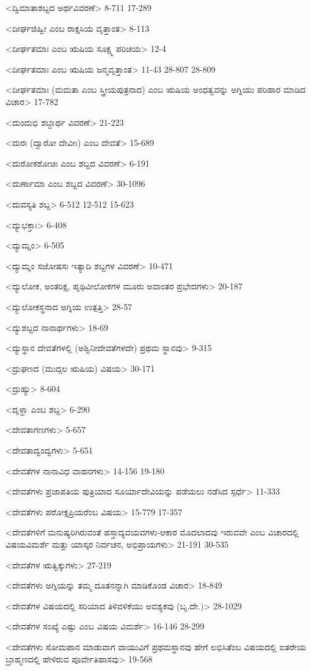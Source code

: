 <ದ್ವಿಮಾತಾಶಬ್ದದ ಅರ್ಥವಿವರಣೆ>
8-711
17-289

<ದೀರ್ಘಜಿಹ್ವೀ ಎಂಬ ರಾಕ್ಷಸಿಯ ವೃತ್ತಾಂತ>
8-113

<ದೀರ್ಘತಮಾಃ ಎಂಬ ಋಷಿಯ ಸೂಕ್ಷ್ಮ ಪರಿಚಯ>
12-4

<ದೀರ್ಘತಮಾಃ ಎಂಬ ಋಷಿಯ ಜನ್ಮವೃತ್ತಾಂತ>
11-43
28-807
28-809

<ದೀರ್ಘತಮಾಃ (ಮಮತಾ ಎಂಬ ಸ್ತ್ರೀಯಪುತ್ರನಾದ) ಎಂಬ ಋಷಿಯ ಅಂಧತ್ವವನ್ನು ಅಗ್ನಿಯು ಪರಿಹಾರ ಮಾಡಿದ ವಿಚಾರ>
17-782

<ದುಂದುಭಿ ಶಬ್ದಾರ್ಥ ವಿವರಣೆ>
21-223

<ದುರಃ (ದ್ವಾರೋ ದೇವೀಃ) ಎಂಬ ದೇವತೆ>
15-689

<ದುರೋಕಶೋಚಿಃ ಎಂಬ ಶಬ್ದದ ವಿವರಣೆ>
6-191

<ದುರ್ಣಾಮಾ ಎಂಬ ಶಬ್ದದ ವಿವರಣೆ>
30-1096

<ದುವಸ್ಯತಿ ಶಬ್ದ>
6-512 
12-512
15-623

<ದ್ಯುಭಕ್ತಾಃ>
6-408

<ದ್ಯುಮ್ನಂ>
6-505

<ದ್ಯುಮ್ನಂ ಸಜೋಷಸಃ ಇತ್ಯಾದಿ ಶಬ್ದಗಳ ವಿವರಣೆ>
10-471

<ದ್ಯುಲೋಕ, ಅಂತರಿಕ್ಷ, ಪೃಥಿವೀಲೋಕಗಳ ಮೂರು ಅವಾಂತರ ಪ್ರಭೇದಗಳು>
20-187

<ದ್ಯುಲೋಕಸ್ಥನಾದ ಅಗ್ನಿಯ ಉತ್ಪತ್ತಿ>
28-57

<ದ್ಯುಶಬ್ದದ ನಾನಾರ್ಥಗಳು>
18-69

<ದ್ಯುಸ್ಥಾನ ದೇವತೆಗಳಲ್ಲಿ (ಅಶ್ವಿನೀದೇವತೆಗಳದೇ) ಪ್ರಥಮ ಸ್ಥಾನವು>
9-315

<ದ್ರುಘಣದ (ಮುದ್ಗಲ ಋಷಿಯ) ವಿಷಯ>
30-171

<ದ್ರುಹ್ಯು>
8-604

<ದೃಳ್ಹಾ ಎಂಬ ಶಬ್ದ>
6-290

<ದೇವತಾಗಣಗಳು>
5-657

<ದೇವತಾದ್ವಂದ್ವಗಳು>
5-651

<ದೇವತೆಗಳ ನಾನಾವಿಧ ವಾಹನಗಳು>
14-156
19-180

<ದೇವತೆಗಳು ಪ್ರಜಾಪತಿಯ ಪುತ್ರಿಯಾದ ಸೂರ್ಯಾದೇವಿಯನ್ನು ಪಡೆಯಲು ನಡೆಸಿದ ಸ್ಪರ್ಧೆ>
11-333

<ದೇವತೆಗಳು ಪರೋಕ್ಷಪ್ರಿಯರೆಂಬ ವಿಷಯ>
15-779
17-357

<ದೇವತೆಗಳಿಗೆ ಮನುಷ್ಯರಿಗಿರುವಂತೆ ಹಸ್ತಾದ್ಯವಯವಗಳು-ಆಕಾರ ಮೊದಲಾದವು ಇರುವವೇ ಎಂಬ ವಿಚಾರದಲ್ಲಿ ವಿಷಯವಿಮರ್ಶೆ ಮತ್ತು ಯಾಸ್ಕರ ನಿರ್ವಚನ, ಅಭಿಪ್ರಾಯಗಳು>
21-191
30-535

<ದೇವತೆಗಳ ಋತ್ವಿಕ್ಕುಗಳು>
27-219

<ದೇವತೆಗಳು ಅಗ್ನಿಯನ್ನು ತಮ್ಮ ದೂತನನ್ನಾಗಿ ಮಾಡಿಕೊಂಡ ವಿಚಾರ>
18-849

<ದೇವತೆಗಳ ವಿಷಯದಲ್ಲಿ ಸರಿಯಾದ ತಿಳಿವಳಿಕೆಯು ಅವಶ್ಯಕವು (ಬೃ.ದೇ.)>
28-1029

<ದೇವತೆಗಳ ಸಂಖ್ಯೆ ಎಷ್ಟು ಎಂಬ ವಿಷಯ ವಿಮರ್ಶೆ>
16-146 
28-299

<ದೇವತೆಗಳು ಸೋಮಪಾನ ಮಾಡುವಾಗ ವಾಯುವಿಗೆ ಪ್ರಥಮಸ್ಥಾನವು ಹೇಗೆ ಲಭಿಸಿತೆಂಬ ವಿಷಯದಲ್ಲಿ ಐತರೇಯ ಬ್ರಾಹ್ಮಣದಲ್ಲಿ ಹೇಳಿರುವ ಪೂರ್ವೇತಿಹಾಸವು>
19-568

